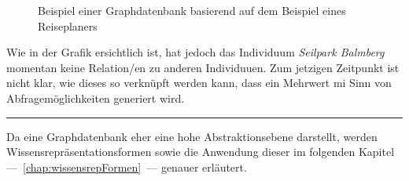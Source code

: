 \begin{figure}[H]
\centering {}
\caption{Beispiel einer Graphdatenbank basierend auf dem Beispiel eines Reiseplaners\label{fig:protegebeispiel}\protect\footnotemark}
\end{figure}

Wie in der Grafik ersichtlich ist, hat jedoch das Individuum \textit{Seilpark Balmberg} momentan keine Relation/en zu anderen Individuuen. Zum jetzigen Zeitpunkt ist nicht klar, wie dieses so verknüpft werden kann, dass ein Mehrwert mi Sinn von Abfragemöglichkeiten generiert wird.

\vspace{0.1pt}
\noindent\rule[1ex]{\textwidth}{1pt}

Da eine Graphdatenbank eher eine hohe Abstraktionsebene darstellt, werden Wissensrepräsentationsformen sowie die Anwendung dieser im folgenden Kapitel ---~\ref{chap:wissensrepFormen}~--- genauer erläutert.
